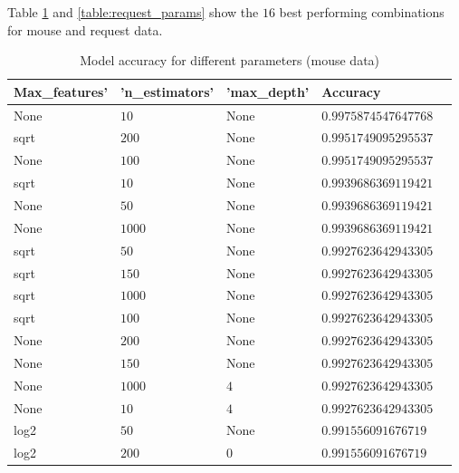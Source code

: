 \documentclass[
    fontsize=12pt,
    headings=small,
    parskip=half,           %
    bibliography=totoc,
    numbers=noenddot,       %
    open=any,               %
    final                   %
]{scrreprt}
\renewcommand{\arraystretch}{1.5}
\begin{document}
Table \ref{table:mouse_params} and \ref{table:request_params} show the $16$ best performing combinations for mouse  and request data.

\setlength{\arrayrulewidth}{0.2mm}
\setlength{\tabcolsep}{18pt}
\renewcommand{\arraystretch}{0.9}


\begin{table}[h!]
\centering
\caption{Model accuracy for different parameters (mouse data)}
\label{table:mouse_params}
\begin{tabular}{|l|l|l|l|l}
\hline
Max\_features' & 'n\_estimators' & 'max\_depth' & Accuracy \\
\hline
None          & $ 10$           & None         & $ 0.9975874547647768$ \\
sqrt          & $ 200$          & None         & $ 0.9951749095295537$ \\
None          & $ 100$          & None         & $ 0.9951749095295537$ \\
sqrt          & $ 10$           & None         & $ 0.9939686369119421$ \\
None          & $ 50$           & None         & $ 0.9939686369119421$ \\
None          & $ 1000$         & None         & $ 0.9939686369119421$ \\
sqrt          & $ 50$           & None         & $ 0.9927623642943305$ \\
sqrt          & $ 150$          & None         & $ 0.9927623642943305$ \\
sqrt          & $ 1000$         & None         & $ 0.9927623642943305$ \\
sqrt          & $ 100$          & None         & $ 0.9927623642943305$ \\
None          & $ 200$          & None         & $ 0.9927623642943305$ \\
None          & $ 150$          & None         & $ 0.9927623642943305$ \\
None          & $ 1000$         & $ 4$         & $ 0.9927623642943305$ \\
None          & $ 10$           & $ 4$         & $ 0.9927623642943305$ \\
log2          & $ 50$           & None         & $ 0.991556091676719$ \\
log2          & $ 200$          & $ 0$         & $ 0.991556091676719$ \\
\hline
\end{tabular}
\end{table}
\end{document}
